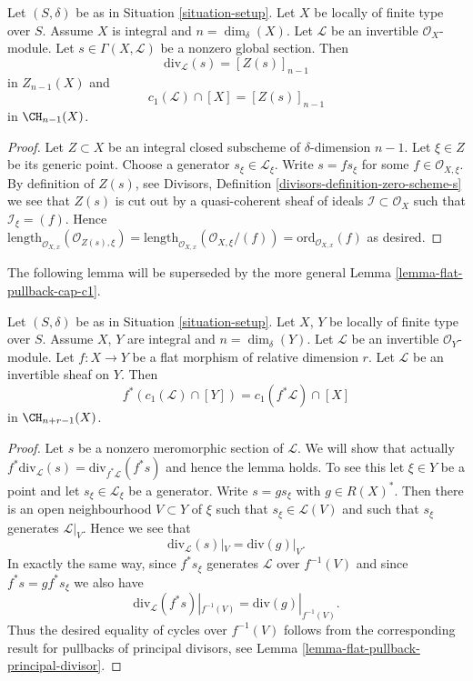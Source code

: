 \begin{lemma}
\label{lemma-compute-c1}
Let $(S, \delta)$ be as in Situation \ref{situation-setup}.
Let $X$ be locally of finite type over $S$. Assume $X$ is
integral and $n = \dim_\delta(X)$.
Let $\mathcal{L}$ be an invertible $\mathcal{O}_X$-module.
Let $s \in \Gamma(X, \mathcal{L})$ be a nonzero global section.
Then
$$
\text{div}_\mathcal{L}(s) = [Z(s)]_{n - 1}
$$
in $Z_{n - 1}(X)$ and
$$
c_1(\mathcal{L}) \cap [X] = [Z(s)]_{n - 1}
$$
in $\CH_{n - 1}(X)$.
\end{lemma}

\begin{proof}
Let $Z \subset X$ be an integral closed subscheme of
$\delta$-dimension $n - 1$. Let $\xi \in Z$ be its generic
point. Choose a generator $s_\xi \in \mathcal{L}_\xi$.
Write $s = fs_\xi$ for some $f \in \mathcal{O}_{X, \xi}$.
By definition of $Z(s)$, see
Divisors, Definition \ref{divisors-definition-zero-scheme-s}
we see that $Z(s)$ is cut out by a quasi-coherent
sheaf of ideals $\mathcal{I} \subset \mathcal{O}_X$ such
that $\mathcal{I}_\xi = (f)$. Hence
$\text{length}_{\mathcal{O}_{X, x}}(\mathcal{O}_{Z(s), \xi})
=
\text{length}_{\mathcal{O}_{X, x}}(\mathcal{O}_{X, \xi}/(f))
=
\text{ord}_{\mathcal{O}_{X, x}}(f)$ as desired.
\end{proof}

\noindent
The following lemma will be superseded by the more general
Lemma \ref{lemma-flat-pullback-cap-c1}.

\begin{lemma}
\label{lemma-flat-pullback-divisor-invertible-sheaf}
Let $(S, \delta)$ be as in Situation \ref{situation-setup}.
Let $X$, $Y$ be locally of finite type over $S$. Assume $X$, $Y$
are integral and $n = \dim_\delta(Y)$.
Let $\mathcal{L}$ be an invertible $\mathcal{O}_Y$-module.
Let $f : X \to Y$ be a flat morphism of relative dimension $r$.
Let $\mathcal{L}$ be an invertible sheaf on $Y$. Then
$$
f^*(c_1(\mathcal{L}) \cap [Y]) = c_1(f^*\mathcal{L}) \cap [X]
$$
in $\CH_{n + r - 1}(X)$.
\end{lemma}

\begin{proof}
Let $s$ be a nonzero meromorphic section of $\mathcal{L}$.
We will show that actually
$f^*\text{div}_\mathcal{L}(s) = \text{div}_{f^*\mathcal{L}}(f^*s)$
and hence the lemma holds.
To see this let $\xi \in Y$ be a point and let $s_\xi \in \mathcal{L}_\xi$
be a generator. Write $s = gs_\xi$ with $g \in R(X)^*$.
Then there is an open neighbourhood $V \subset Y$ of $\xi$
such that $s_\xi \in \mathcal{L}(V)$ and such that $s_\xi$ generates
$\mathcal{L}|_V$. Hence we see that
$$
\text{div}_\mathcal{L}(s)|_V = \text{div}(g)|_V.
$$
In exactly the same way, since $f^*s_\xi$ generates $\mathcal{L}$
over $f^{-1}(V)$ and since $f^*s = g f^*s_\xi$ we also
have
$$
\text{div}_\mathcal{L}(f^*s)|_{f^{-1}(V)}
=
\text{div}(g)|_{f^{-1}(V)}.
$$
Thus the desired equality of cycles over $f^{-1}(V)$ follows from the
corresponding result for pullbacks of principal divisors, see
Lemma \ref{lemma-flat-pullback-principal-divisor}.
\end{proof}



